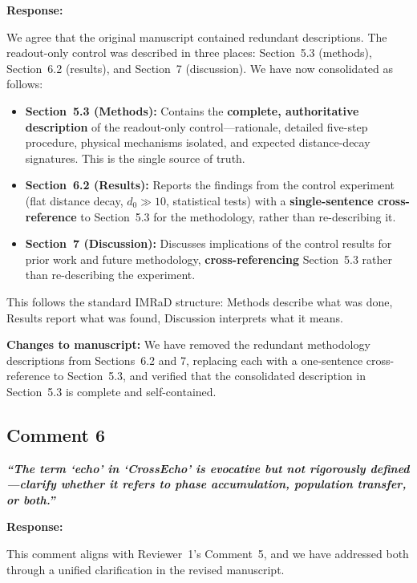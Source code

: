 \documentclass[11pt,a4paper]{article}
\begin{document}
\medskip\noindent\textbf{Response:}

We agree that the original manuscript contained redundant descriptions. The readout-only
control was described in three places: Section~5.3 (methods), Section~6.2 (results), and
Section~7 (discussion). We have now consolidated as follows:

\begin{itemize}[leftmargin=*]
    \item \textbf{Section~5.3 (Methods):} Contains the \textbf{complete, authoritative
    description} of the readout-only control---rationale, detailed five-step procedure,
    physical mechanisms isolated, and expected distance-decay signatures. This is the
    single source of truth.
    \item \textbf{Section~6.2 (Results):} Reports the findings from the control experiment
    (flat distance decay, $d_0 \gg 10$, statistical tests) with a \textbf{single-sentence
    cross-reference} to Section~5.3 for the methodology, rather than re-describing it.
    \item \textbf{Section~7 (Discussion):} Discusses implications of the control results
    for prior work and future methodology, \textbf{cross-referencing} Section~5.3 rather
    than re-describing the experiment.
\end{itemize}

This follows the standard IMRaD structure: Methods describe what was done, Results report
what was found, Discussion interprets what it means.

\medskip\noindent\textbf{Changes to manuscript:} We have removed the redundant methodology
descriptions from Sections~6.2 and 7, replacing each with a one-sentence cross-reference
to Section~5.3, and verified that the consolidated description in Section~5.3 is complete
and self-contained.

\subsection*{Comment 6}

\noindent\textbf{\textit{``The term `echo' in `CrossEcho' is evocative but not rigorously
defined---clarify whether it refers to phase accumulation, population transfer, or
both.''}}

\medskip\noindent\textbf{Response:}

This comment aligns with Reviewer~1's Comment~5, and we have addressed both through a
unified clarification in the revised manuscript.
\end{document}
